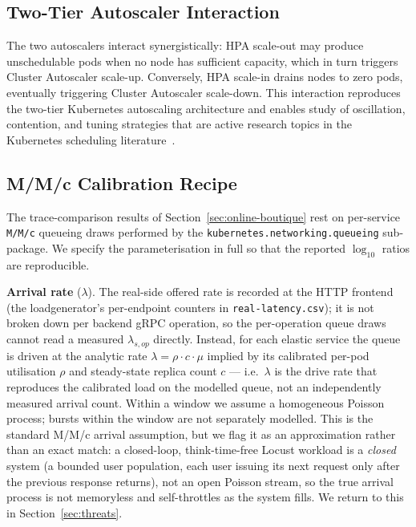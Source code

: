 \documentclass[ASNA,twocolumn]{USG}
\begin{document}
    \subsection{Two-Tier Autoscaler Interaction}

    The two autoscalers interact synergistically: HPA scale-out may
    produce unschedulable pods when no node has sufficient capacity,
    which in turn triggers Cluster Autoscaler scale-up. Conversely, HPA
    scale-in drains nodes to zero pods, eventually triggering
    Cluster Autoscaler scale-down. This interaction reproduces the
    two-tier Kubernetes autoscaling architecture and enables study of
    oscillation, contention, and tuning strategies that are active
    research topics in the Kubernetes scheduling literature~\cite{Li2023}.

    \subsection{M/M/c Calibration Recipe}\label{sec:mmc-calibration}

    The trace-comparison results of Section~\ref{sec:online-boutique}
    rest on per-service \texttt{M/M/c} queueing draws performed by the
    \texttt{kubernetes.networking.queueing} sub-package. We specify the
    parameterisation in full so that the reported $\log_{10}$ ratios are
    reproducible.

    \textbf{Arrival rate} ($\lambda$). The real-side offered rate is
    recorded at the HTTP frontend (the loadgenerator's per-endpoint
    counters in \texttt{real-latency.csv}); it is not broken down per
    backend gRPC operation, so the per-operation queue draws cannot read a
    measured $\lambda_{s,op}$ directly. Instead, for each elastic service
    the queue is driven at the analytic rate $\lambda = \rho \cdot c \cdot
    \mu$ implied by its calibrated per-pod utilisation $\rho$ and
    steady-state replica count $c$ --- i.e.\ $\lambda$ is the drive rate
    that reproduces the calibrated load on the modelled queue, not an
    independently measured arrival count. Within a window we assume a
    homogeneous Poisson process; bursts within the window are not
    separately modelled. This is the standard M/M/c arrival assumption, but we flag
    it as an approximation rather than an exact match: a closed-loop,
    think-time-free Locust workload is a \emph{closed} system (a bounded
    user population, each user issuing its next request only after the
    previous response returns), not an open Poisson stream, so the true
    arrival process is not memoryless and self-throttles as the system
    fills. We return to this in Section~\ref{sec:threats}.
\end{document}
